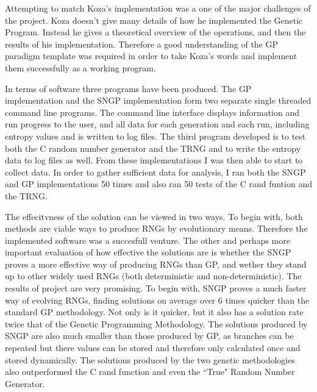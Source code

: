 \documentclass[a4paper,10.5pt]{article}
\begin{document}
Attempting to match Koza's implementation was a one of the major challenges of the project. Koza doesn't give many details of how he implemented the Genetic Program. Instead he gives a theoretical overview of the operations, and then the results of his implementation. Therefore a good understanding of the GP paradigm template was required in order to take Koza's words and implement them successfully as a working program. 

In terms of software three programs have been produced. The GP implementation and the SNGP implementation form two separate single threaded command line programs. The command line interface displays information and run progress to the user, and all data for each generation and each run, including entropy values and is written to log files. 
The third program developed is to test both the C random number generator and the TRNG and to write the entropy data to log files as well.
From these implementations I was then able to start to collect data. In order to gather sufficient data for analysis, I ran both the SNGP and GP implementations 50 times and also ran 50 tests of the C rand funtion and the TRNG. 

The effecitvness of the solution can be viewed in two ways. To begin with, both methods are viable ways to produce RNGs by evolutionary means. Therefore the implemented software was a succesfull venture. The other and perhaps more important evaluation of how effective the solutions are is whether the SNGP proves a more effective way of producing RNGs than GP, and wether they stand up to other widely used RNGs (both deterministic and non-deterministic). The results of project are very promising. To begin with, SNGP proves a much faster way of evolving RNGs, finding solutions on average over 6 times quicker than the standard GP methodology. Not only is it quicker, but it also has a solution rate twice that of the Genetic Programming Methodology. The solutions produced by SNGP are also much smaller than those produced by GP, as branches can be repeated but there values can be stored and therefore only calculated once and stored dynamically. The solutions produced by the two genetic methodologies also outperformed the C rand function and even the ``True" Random Number Generator. 

\newpage
\end{document}
